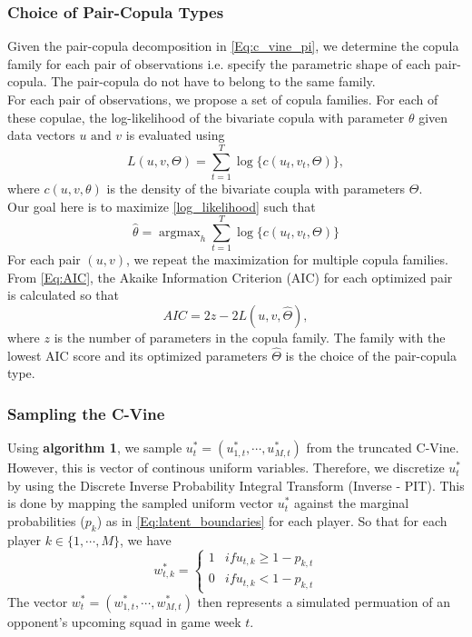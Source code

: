 \documentclass[12pt,oneside,a4paper]{book}
\theoremstyle{definition}
\theoremstyle{remark}
\DeclareMathOperator*{\argmax}{argmax}
\begin{document}
				\subsubsection{Choice of Pair-Copula Types}
				Given the pair-copula decomposition in \ref{Eq:c_vine_pi}, we determine the copula family for each pair of observations i.e. specify the parametric shape of each pair-copula. The pair-copula do not have to belong to the same family.\\
				For each pair of observations, we propose a set of copula families. For each of these copulae, the log-likelihood of the bivariate copula with parameter $\theta$ given data vectors $u \text{ and } v$ is evaluated using
				\begin{equation}\label{log_likelihood}
					L\left(u, v,\Theta \right) = \sum_{t=1}^{T} \log \{c\left( u_t, v_t, \Theta \right)\},
				\end{equation}
				where $c\left(u,v,\theta \right)$ is the density of the bivariate coupla with parameters $\Theta$.\\
				Our goal here is to maximize \ref{log_likelihood} such that
				\begin{equation}
					\hat{\theta} = \argmax_{h} \sum_{t=1}^{T} \log \{c \left(u_t,v_t,\Theta \right) \}
				\end{equation}
				For each pair $\left(u,v\right)$, we repeat the maximization for multiple copula families. From \ref{Eq:AIC}, the Akaike Information Criterion (AIC) for each optimized pair is calculated so that
				\begin{equation}
					AIC = 2z - 2L\left(u,v, \hat{\Theta}\right),
				\end{equation}
				where $z$ is the number of parameters in the copula family.
				The family with the lowest AIC score and its optimized parameters $\hat{\Theta}$ is the choice of the pair-copula type.

				\subsubsection{Sampling the C-Vine}
				Using \textbf{algorithm 1}, we sample $u_t^* = (u_{1,t}^*, \cdots, u_{M,t}^*)$ from the truncated C-Vine. However, this is vector of continous uniform variables. Therefore, we discretize $u_t^*$ by using the Discrete Inverse Probability Integral Transform (Inverse - PIT).
				This is done by mapping the sampled uniform vector $u_t^*$ against the marginal probabilities ($p_k$) as in \ref{Eq:latent_boundaries} for each player. So that for each player $k \in \{1, \cdots, M\}$, we have
				\begin{equation}
					w^*_{t,k} =
					\begin{cases}
						1 & if u_{t,k} \geqslant 1 - p_{k,t}\\
						0 & if u_{t,k} < 1 - p_{k,t}
					\end{cases}
				\end{equation}
				The vector $w^*_{t} = \left(w^*_{1,t}, \cdots, w^*_{M,t} \right)$ then represents a simulated permuation of an opponent's upcoming squad in game week $t$.
\end{document}
